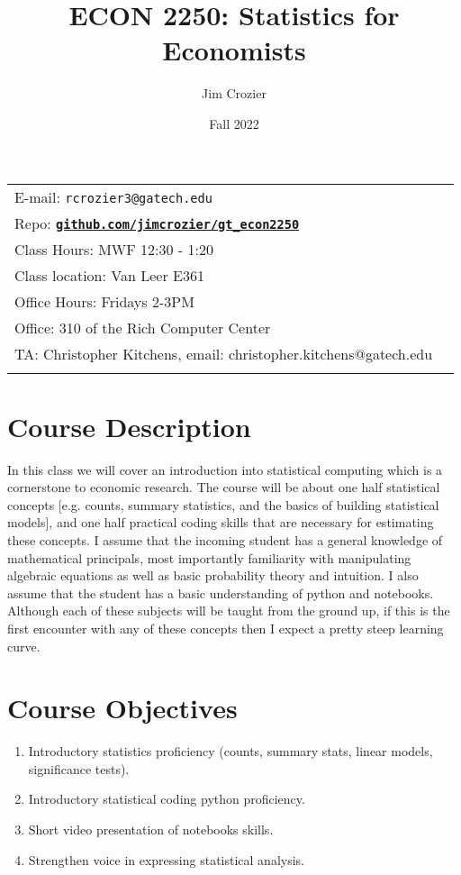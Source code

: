 \documentclass[11pt]{article}
\title{ECON 2250: Statistics for Economists}
\author{Jim Crozier}
\date{Fall 2022}
\newcommand{\blankline}{\quad\pagebreak[2]}
\begin{document}
\maketitle

\blankline

\begin{tabular*}{.93\textwidth}{@{\extracolsep{\fill}}lr}



  E-mail: \texttt{rcrozier3@gatech.edu} \\
  Repo: \href{http://github.com/jimcrozier/gt\_econ2250}{\tt\bf github.com/jimcrozier/gt\_econ2250}  \\


  Class Hours: MWF 12:30 - 1:20 \\
  Class location: 	Van Leer E361 \\

  Office Hours: Fridays 2-3PM  \\
Office: 310 of the Rich Computer Center  \\
TA: Christopher Kitchens, email: christopher.kitchens@gatech.edu \\
&  \\
\hline
\end{tabular*}

\vspace{10 mm}

\section*{Course Description}

In this class we will cover an introduction into statistical computing which is a cornerstone to economic research. The course will be about one half statistical concepts [e.g. counts, summary statistics, and the basics of building statistical models], and one half practical coding skills that are necessary for estimating these concepts. I assume that the incoming student has a general knowledge of mathematical principals, most importantly familiarity with manipulating algebraic equations as well as basic probability theory and intuition. I also assume that the student has a basic understanding of python and notebooks. Although each of these subjects will be taught from the ground up, if this is the first encounter with any of these concepts then I expect a pretty steep learning curve. 




\section*{Course Objectives}
\begin{enumerate}
\item Introductory statistics proficiency (counts, summary stats, linear models, significance tests).
\item Introductory statistical coding python proficiency.
\item Short video presentation of notebooks skills.
\item Strengthen voice in expressing statistical analysis. 
\end{enumerate}
\end{document}

